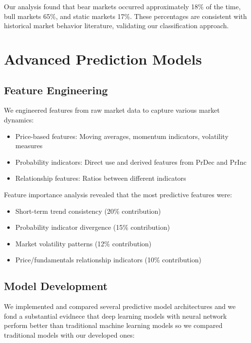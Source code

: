 \documentclass[13pt]{article}
\begin{document}
Our analysis found that bear markets occurred approximately 18\% of the time, bull markets 65\%, and static markets 17\%. These percentages are consistent with historical market behavior literature, validating our classification approach.



\section{Advanced Prediction Models}
\subsection{Feature Engineering}
We engineered features from raw market data to capture various market dynamics:
\begin{itemize}
	\item Price-based features: Moving averages, momentum indicators, volatility measures
	\item Probability indicators: Direct use and derived features from PrDec and PrInc
	\item Relationship features: Ratios between different indicators
\end{itemize}
\vspace{0.4cm}
Feature importance analysis revealed that the most predictive features were:
\begin{itemize}
	\item Short-term trend consistency (20\% contribution)
	\item Probability indicator divergence (15\% contribution)
	\item Market volatility patterns (12\% contribution)
	\item Price/fundamentals relationship indicators (10\% contribution)
\end{itemize}

\subsection{Model Development}

We implemented and compared several predictive model architectures and we fond a substantial evidnece that deep learning models with neural network perform better than traditional machine learning models so we compared traditional models with our developed ones:
\end{document}
